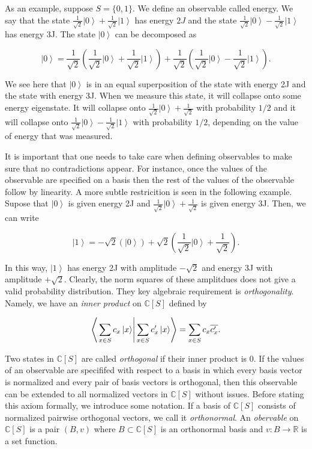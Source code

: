 \documentclass{article}
\theoremstyle{definition}
\newcommand{\RR}{\mathbb{R}}
\newcommand{\CC}{\mathbb{C}}
\newcommand{\0}{\left|0\right>}
\newcommand{\1}{\left|1\right>}
\numberwithin{figure}{section}
\begin{document}
As an example, suppose $S=\{0,1\}$. We define an observable called energy. We say that the state $\frac{1}{\sqrt{2}}\0+\frac{1}{\sqrt{2}}\1$ has energy $2J$ and the state $\frac{1}{\sqrt{2}}\0-\frac{1}{\sqrt{2}}\1$ has energy 3J. The state $\0$ can be decomposed as

$$\0=\frac{1}{\sqrt{2}}\left(\frac{1}{\sqrt{2}}\0+\frac{1}{\sqrt{2}}\1\right)+\frac{1}{\sqrt{2}}\left(\frac{1}{\sqrt{2}}\0-\frac{1}{\sqrt{2}}\1\right).$$

We see here that $\0$ is in an equal superposition of the state with energy 2J and the state with energy 3J. When we measure this state, it will collapse onto some energy eigenstate. It will collapse onto $\frac{1}{\sqrt{2}}\0+\frac{1}{\sqrt{2}}$ with probability $1/2$ and it will collapse onto $\frac{1}{\sqrt{2}}\0-\frac{1}{\sqrt{2}}\1$ with probability $1/2$, depending on the value of energy that was measured.

It is important that one needs to take care when defining observables to make sure that no contradictions appear. For instance, once the values of the observable are specified on a basis then the rest of the values of the observable follow by linearity. A more subtle restricition is seen in the following example. Supose that $\0$ is given energy 2J and $\frac{1}{\sqrt{2}}\0+\frac{1}{\sqrt{2}}$ is given energy 3J. Then, we can write

$$\1=-\sqrt{2}(\0)+\sqrt{2}\left(\frac{1}{\sqrt{2}}\0+\frac{1}{\sqrt{2}}\right).$$

In this way, $\1$ has energy 2J with amplitude $-\sqrt{2}$ and energy 3J with amplitude $+\sqrt{2}$. Clearly, the norm squares of these amplitdues does not give a valid probability distribution. They key algebraic requirement is \textit{orthogonality}. Namely, we have an \textit{inner product} on $\CC[S]$ defined by

$$\left<\left.\sum_{x\in S}c_x\ket{x}\right| \sum_{x\in S}c'_x \ket{x}\right>=\sum_{x\in S}c_x\overline{c_x'}.$$

Two states in $\CC[S]$ are called \textit{orthogonal} if their inner product is $0$. If the values of an observable are specififed with respect to a basis in which every basis vector is normalized and every pair of basis vectors is orthogonal, then this observable can be extended to all normalized vectors in $\CC[S]$ without issues. Before stating this axiom formally, we introduce some notation. If a basis of $\CC[S]$ consists of normalized pairwise orthogonal vectors, we call it \textit{orthonormal}. An \textit{obervable} on $\CC[S]$ is a pair $(B,v)$ where $B\subset \CC[S]$ is an orthonormal basis and $v:B\to \RR$ is a set function.
\end{document}
